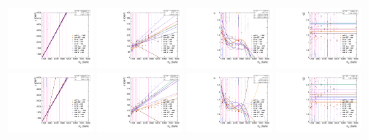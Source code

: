 \begin{figure}[htbp]
  \centering
  \includegraphics[width=0.2\textwidth]{fig/analysisAppendix/paramSignalShape_allSig_MVV_HP_bb_HDy_MEAN.pdf}
  \includegraphics[width=0.2\textwidth]{fig/analysisAppendix/paramSignalShape_allSig_MVV_HP_bb_HDy_SIGMA.pdf}
  \includegraphics[width=0.2\textwidth]{fig/analysisAppendix/paramSignalShape_allSig_MVV_HP_bb_HDy_ALPHA1.pdf}
  \includegraphics[width=0.2\textwidth]{fig/analysisAppendix/paramSignalShape_allSig_MVV_HP_bb_HDy_ALPHA2.pdf}\\
  \includegraphics[width=0.2\textwidth]{fig/analysisAppendix/paramSignalShape_allSig_MVV_LP_bb_HDy_MEAN.pdf}
  \includegraphics[width=0.2\textwidth]{fig/analysisAppendix/paramSignalShape_allSig_MVV_LP_bb_HDy_SIGMA.pdf}
  \includegraphics[width=0.2\textwidth]{fig/analysisAppendix/paramSignalShape_allSig_MVV_LP_bb_HDy_ALPHA1.pdf}
  \includegraphics[width=0.2\textwidth]{fig/analysisAppendix/paramSignalShape_allSig_MVV_LP_bb_HDy_ALPHA2.pdf}\\

\end{figure}
